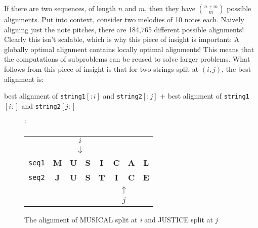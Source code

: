 If there are two sequences, of length $n$ and $m$, then they have $\binom{n+m}{m}$ possible alignments. Put into context, consider two melodies of 10 notes each. Naively aligning just the note pitches, there are 184,765 different possible alignments! Clearly this isn't scalable, which is why this piece of insight is important: A globally optimal alignment contains locally optimal alignments! This means that the computations of subproblems can be reused to solve larger problems. What follows from this piece of insight is that for two strings split at $(i, j)$, the best alignment is:

\begin{center}
best alignment of \texttt{string1}$[:i]$ and \texttt{string2}$[:j]$ 
$+$ best alignment of \texttt{string1}$[i:]$ and \texttt{string2}$[j:]$
\end{center}

\begin{figure}[!h]`
\centering
\begin{tabular}{lccccccc}
   & {\color[HTML]{333333} \textbf{}} & \multicolumn{2}{c}{{\color[HTML]{333333} $i$}}          & {\color[HTML]{333333} \textbf{}} & {\color[HTML]{333333} \textbf{}} & {\color[HTML]{333333} \textbf{}} & {\color[HTML]{333333} \textbf{}} \\
   & {\color[HTML]{333333} \textbf{}} & \multicolumn{2}{c}{{\color[HTML]{333333} $\downarrow$}} & {\color[HTML]{333333} \textbf{}} & {\color[HTML]{333333} \textbf{}} & {\color[HTML]{333333} \textbf{}} & {\color[HTML]{333333} \textbf{}} \\
\texttt{seq1} & \textbf{M}                       & \textbf{U}                  & \textbf{S}                & \textbf{I}                       & \textbf{C}                       & \textbf{A}                       & \textbf{L}                       \\
\texttt{seq2} & \textbf{J}                       & \textbf{U}                  & \textbf{S}                & \textbf{T}                       & \textbf{I}                       & \textbf{C}                       & \textbf{E}                       \\
   &                                  &                             &                           &                                  & \multicolumn{2}{c}{$\uparrow$}                                      &                                  \\
   &                                  &                             &                           &                                  & \multicolumn{2}{c}{$j$}                                             &                                 
\end{tabular}
\caption{The alignment of MUSICAL split at \textit{i} and JUSTICE split at \textit{j}}
\label{indexed musical and justice}
\end{figure}

